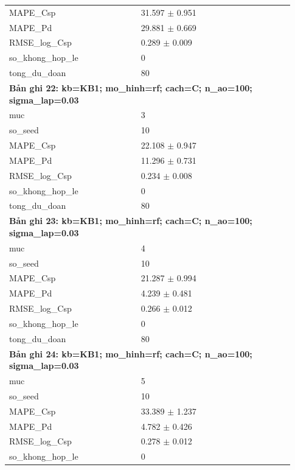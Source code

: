 \begin{longtable}{p{0.43\linewidth}p{0.50\linewidth}}
MAPE\_\allowbreak Csp & 31.597 $\pm$ 0.951 \\
MAPE\_\allowbreak Pd & 29.881 $\pm$ 0.669 \\
RMSE\_\allowbreak log\_\allowbreak Csp & 0.289 $\pm$ 0.009 \\
so\_\allowbreak khong\_\allowbreak hop\_\allowbreak le & 0 \\
tong\_\allowbreak du\_\allowbreak doan & 80 \\
\midrule
\multicolumn{2}{p{0.95\linewidth}}{\textbf{Bản ghi 22: kb=KB1; mo\_hinh=rf; cach=C; n\_ao=100; sigma\_lap=0.03}} \\
muc & 3 \\
so\_\allowbreak seed & 10 \\
MAPE\_\allowbreak Csp & 22.108 $\pm$ 0.947 \\
MAPE\_\allowbreak Pd & 11.296 $\pm$ 0.731 \\
RMSE\_\allowbreak log\_\allowbreak Csp & 0.234 $\pm$ 0.008 \\
so\_\allowbreak khong\_\allowbreak hop\_\allowbreak le & 0 \\
tong\_\allowbreak du\_\allowbreak doan & 80 \\
\midrule
\multicolumn{2}{p{0.95\linewidth}}{\textbf{Bản ghi 23: kb=KB1; mo\_hinh=rf; cach=C; n\_ao=100; sigma\_lap=0.03}} \\
muc & 4 \\
so\_\allowbreak seed & 10 \\
MAPE\_\allowbreak Csp & 21.287 $\pm$ 0.994 \\
MAPE\_\allowbreak Pd & 4.239 $\pm$ 0.481 \\
RMSE\_\allowbreak log\_\allowbreak Csp & 0.266 $\pm$ 0.012 \\
so\_\allowbreak khong\_\allowbreak hop\_\allowbreak le & 0 \\
tong\_\allowbreak du\_\allowbreak doan & 80 \\
\midrule
\multicolumn{2}{p{0.95\linewidth}}{\textbf{Bản ghi 24: kb=KB1; mo\_hinh=rf; cach=C; n\_ao=100; sigma\_lap=0.03}} \\
muc & 5 \\
so\_\allowbreak seed & 10 \\
MAPE\_\allowbreak Csp & 33.389 $\pm$ 1.237 \\
MAPE\_\allowbreak Pd & 4.782 $\pm$ 0.426 \\
RMSE\_\allowbreak log\_\allowbreak Csp & 0.278 $\pm$ 0.012 \\
so\_\allowbreak khong\_\allowbreak hop\_\allowbreak le & 0 \\

\end{longtable}
